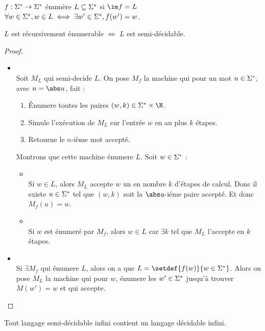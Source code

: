 \begin{definition}
	$f : \Sigma^{*} \to \Sigma^{*}$ énumère $L \subseteq \Sigma^{*}$ si $\im f = L$ \ie $\forall w \in \Sigma^{*}, w \in L \iff \exists w' \in \Sigma^{*}, f (w') = w$.
\end{definition}

\begin{prop}
	$L$ est récursivement énumerable $\iff$ $L$ est semi-décidable.
\end{prop}

\begin{proof}
	\begin{itemize}
		\item \bimpLR \\
		      Soit $M_L$ qui semi-decide $L$. On pose $M_f$ la machine qui pour un mot $u \in \Sigma^{*}$, avec $n = \abs u$, fait :
		      \begin{enumerate}
			      \item Énumere toutes les paires $(w,k) \in \mots \times \N$.
			      \item Simule l'exécution de $M_L$ sur l'entrée $w$ en au plus $k$ étapes.
			      \item Retourne le $n$-ième mot accepté.
		      \end{enumerate}

		      Montrons que cette machine énumere $L$. Soit $w \in \Sigma^{*}$ :
		      \begin{itemize}
			      \item \bimpLR \\
			            Si $w \in L$, alors $M_L$ accepte $w$ un en nombre $k$ d'étapes de calcul. Donc il existe $u \in \Sigma^{*}$ tel que
			            $(w,k)$ soit la $\abs u$-iéme paire accepté. Et donc $M_f(u) = w$.
			      \item \bimpRL \\
			            Si $w$ est énumeré par $M_f$, alors $w \in L$ car $\exists k$ tel que $M_L$ l'accepte en $k$ étapes.
		      \end{itemize}

		\item \bimpRL \\
		      Si $\exists M_f$ qui énumere $L$, alors on a que $L = \setdef {f(w)} {w \in \mots}$. Alors on pose $M_L$ la machine qui pour $w$,
		      énumere les $w' \in \Sigma^{*}$ jusqu'à trouver $M(w') = w$ et qui accepte.
	\end{itemize}
\end{proof}


\begin{prop}
	Tout langage semi-décidable infini contient un langage décidable infini.
\end{prop}

